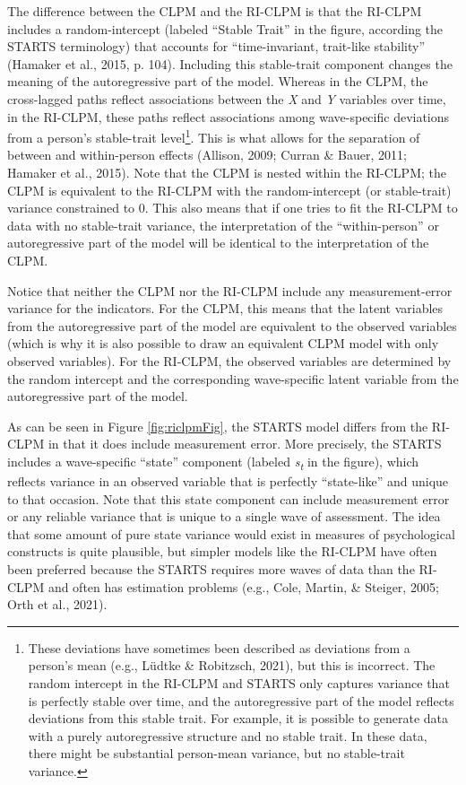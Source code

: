 \documentclass[
  english,
  man,floatsintext]{apa6}
\begin{document}
The difference between the CLPM and the RI-CLPM is that the RI-CLPM includes a random-intercept (labeled ``Stable Trait'' in the figure, according the STARTS terminology) that accounts for ``time-invariant, trait-like stability'' (Hamaker et al., 2015, p. 104). Including this stable-trait component changes the meaning of the autoregressive part of the model. Whereas in the CLPM, the cross-lagged paths reflect associations between the \emph{X} and \emph{Y} variables over time, in the RI-CLPM, these paths reflect associations among wave-specific deviations from a person's stable-trait level\footnote{These deviations have sometimes been described as deviations from a person's mean (e.g., Lüdtke \& Robitzsch, 2021), but this is incorrect. The random intercept in the RI-CLPM and STARTS only captures variance that is perfectly stable over time, and the autoregressive part of the model reflects deviations from this stable trait. For example, it is possible to generate data with a purely autoregressive structure and no stable trait. In these data, there might be substantial person-mean variance, but no stable-trait variance.}. This is what allows for the separation of between and within-person effects (Allison, 2009; Curran \& Bauer, 2011; Hamaker et al., 2015). Note that the CLPM is nested within the RI-CLPM; the CLPM is equivalent to the RI-CLPM with the random-intercept (or stable-trait) variance constrained to 0. This also means that if one tries to fit the RI-CLPM to data with no stable-trait variance, the interpretation of the ``within-person'' or autoregressive part of the model will be identical to the interpretation of the CLPM.

Notice that neither the CLPM nor the RI-CLPM include any measurement-error variance for the indicators. For the CLPM, this means that the latent variables from the autoregressive part of the model are equivalent to the observed variables (which is why it is also possible to draw an equivalent CLPM model with only observed variables). For the RI-CLPM, the observed variables are determined by the random intercept and the corresponding wave-specific latent variable from the autoregressive part of the model.

As can be seen in Figure \ref{fig:riclpmFig}, the STARTS model differs from the RI-CLPM in that it does include measurement error. More precisely, the STARTS includes a wave-specific ``state'' component (labeled \emph{s\textsubscript{t}} in the figure), which reflects variance in an observed variable that is perfectly ``state-like'' and unique to that occasion. Note that this state component can include measurement error or any reliable variance that is unique to a single wave of assessment. The idea that some amount of pure state variance would exist in measures of psychological constructs is quite plausible, but simpler models like the RI-CLPM have often been preferred because the STARTS requires more waves of data than the RI-CLPM and often has estimation problems (e.g., Cole, Martin, \& Steiger, 2005; Orth et al., 2021).
\end{document}
